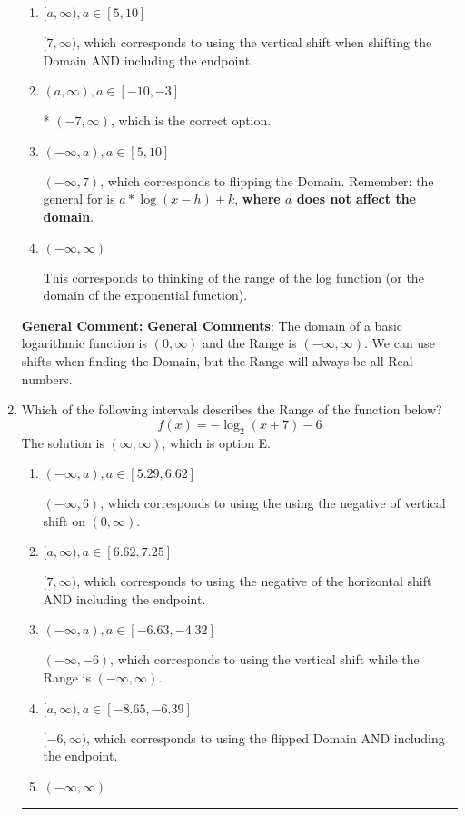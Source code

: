 \documentclass{extbook}[14pt]
\newcommand{\litem}[1]{\item #1

\rule{\textwidth}{0.4pt}}
\begin{document}
\begin{enumerate}
{\begin{enumerate}[label=\Alph*.]
$(-\infty, -7]$, which corresponds to using the negative vertical shift AND including the endpoint AND flipping the domain.
\item \( [a, \infty), a \in [5, 10] \)

$[7, \infty)$, which corresponds to using the vertical shift when shifting the Domain AND including the endpoint.
\item \( (a, \infty), a \in [-10, -3] \)

* $(-7, \infty)$, which is the correct option.
\item \( (-\infty, a), a \in [5, 10] \)

$(-\infty, 7)$, which corresponds to flipping the Domain. Remember: the general for is $a*\log(x-h)+k$, \textbf{where $a$ does not affect the domain}.
\item \( (-\infty, \infty) \)

This corresponds to thinking of the range of the log function (or the domain of the exponential function).
\end{enumerate}

\textbf{General Comment:} \textbf{General Comments}: The domain of a basic logarithmic function is $(0, \infty)$ and the Range is $(-\infty, \infty)$. We can use shifts when finding the Domain, but the Range will always be all Real numbers.
}
\litem{
Which of the following intervals describes the Range of the function below?
\[ f(x) = -\log_2{(x+7)}-6 \]
The solution is \( (\infty, \infty) \), which is option E.\begin{enumerate}[label=\Alph*.]
\item \( (-\infty, a), a \in [5.29, 6.62] \)

$(-\infty, 6)$, which corresponds to using the using the negative of vertical shift on $(0, \infty)$.
\item \( [a, \infty), a \in [6.62, 7.25] \)

$[7, \infty)$, which corresponds to using the negative of the horizontal shift AND including the endpoint.
\item \( (-\infty, a), a \in [-6.63, -4.32] \)

$(-\infty, -6)$, which corresponds to using the vertical shift while the Range is $(-\infty, \infty)$.
\item \( [a, \infty), a \in [-8.65, -6.39] \)

$[-6, \infty)$, which corresponds to using the flipped Domain AND including the endpoint.
\item \( (-\infty, \infty) \)


\end{enumerate}}
\end{enumerate}
\end{document}
